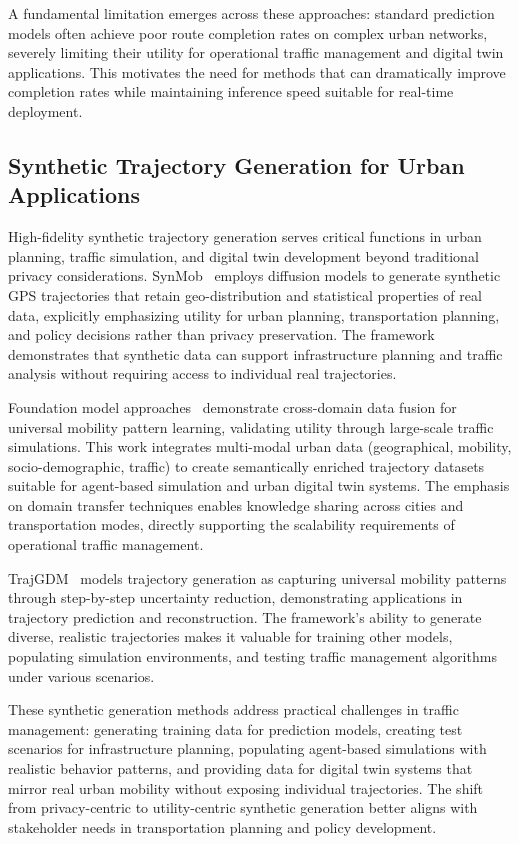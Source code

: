 A fundamental limitation emerges across these approaches: standard prediction models often achieve poor route completion rates on complex urban networks, severely limiting their utility for operational traffic management and digital twin applications. This motivates the need for methods that can dramatically improve completion rates while maintaining inference speed suitable for real-time deployment.

\subsection{Synthetic Trajectory Generation for Urban Applications}
\label{sec:lit-synthetic-urban}

High-fidelity synthetic trajectory generation serves critical functions in urban planning, traffic simulation, and digital twin development beyond traditional privacy considerations. SynMob~\cite{zhuSynMobCreatingHighFidelity} employs diffusion models to generate synthetic GPS trajectories that retain geo-distribution and statistical properties of real data, explicitly emphasizing utility for urban planning, transportation planning, and policy decisions rather than privacy preservation. The framework demonstrates that synthetic data can support infrastructure planning and traffic analysis without requiring access to individual real trajectories.

Foundation model approaches~\cite{maLearningUniversalHuman2025} demonstrate cross-domain data fusion for universal mobility pattern learning, validating utility through large-scale traffic simulations. This work integrates multi-modal urban data (geographical, mobility, socio-demographic, traffic) to create semantically enriched trajectory datasets suitable for agent-based simulation and urban digital twin systems. The emphasis on domain transfer techniques enables knowledge sharing across cities and transportation modes, directly supporting the scalability requirements of operational traffic management.

TrajGDM~\cite{chuSimulatingHumanMobility2024} models trajectory generation as capturing universal mobility patterns through step-by-step uncertainty reduction, demonstrating applications in trajectory prediction and reconstruction. The framework's ability to generate diverse, realistic trajectories makes it valuable for training other models, populating simulation environments, and testing traffic management algorithms under various scenarios.

These synthetic generation methods address practical challenges in traffic management: generating training data for prediction models, creating test scenarios for infrastructure planning, populating agent-based simulations with realistic behavior patterns, and providing data for digital twin systems that mirror real urban mobility without exposing individual trajectories. The shift from privacy-centric to utility-centric synthetic generation better aligns with stakeholder needs in transportation planning and policy development.

